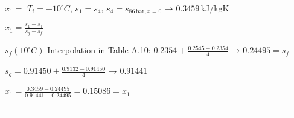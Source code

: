 \( x_1 = \)  
\( T_i = -10^\circ C \), \( s_1 = s_4 \), \( s_4 = s_{86 \, \text{bar}, x=0} \) → \( 0.3459 \, \text{kJ/kgK} \)  

\( x_1 = \frac{s_1 - s_f}{s_g - s_f} \)  

\( s_f (10^\circ C) \)  
Interpolation in Table A.10:  
\( 0.2354 + \frac{0.2545 - 0.2354}{4} \) → \( 0.24495 = s_f \)  

\( s_g = 0.91450 + \frac{0.9132 - 0.91450}{4} \) → \( 0.91441 \)  

\( x_1 = \frac{0.3459 - 0.24495}{0.91441 - 0.24495} = 0.15086 = x_1 \)  

---